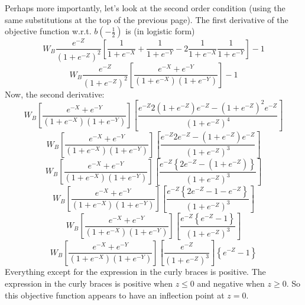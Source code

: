 \documentclass[12pt]{article}
\begin{document}
\vskip1in
Perhaps more importantly, let's look at the second order condition (using the same substitutions at the top of the previous page). The first derivative of the objective function w.r.t. $b(-\frac{1}{2})$ is (in logistic form)
\[
  W_B\frac{e^{-Z}}{\left(1+e^{-Z}\right)^2}\left[\frac{1}{1+e^{-X}} + \frac{1}{1+e^{-Y}} - 2\frac{1}{1+e^{-X}}  \frac{1}{1+e^{-Y}} \right] - 1
\]
\[
  W_B\frac{e^{-Z}}{\left(1+e^{-Z}\right)^2}\left[\frac{e^{-X} + e^{-Y}}{\left(1+e^{-X}\right)\left(1+e^{-Y}\right)} \right] - 1
\]
Now, the second derivative:
\[
  W_B\left[\frac{e^{-X} + e^{-Y}}{\left(1+e^{-X}\right)\left(1+e^{-Y}\right)} \right] \left[ \frac{e^{-Z} 2\left(1+e^{-Z}\right) e^{-Z}-\left(1+e^{-Z}\right)^2 e^{-Z}}{\left(1+e^{-Z}\right)^4} \right]
\]
\[
  W_B\left[\frac{e^{-X} + e^{-Y}}{\left(1+e^{-X}\right)\left(1+e^{-Y}\right)} \right] \left[ \frac{e^{-Z} 2 e^{-Z}-\left(1+e^{-Z}\right) e^{-Z}}{\left(1+e^{-Z}\right)^3} \right]
\]
\[
  W_B\left[\frac{e^{-X} + e^{-Y}}{\left(1+e^{-X}\right)\left(1+e^{-Y}\right)} \right] \left[ \frac{e^{-Z} \left\{2 e^{-Z}-\left(1+e^{-Z}\right) \right\}}{\left(1+e^{-Z}\right)^3} \right]
\]
\[
  W_B\left[\frac{e^{-X} + e^{-Y}}{\left(1+e^{-X}\right)\left(1+e^{-Y}\right)} \right] \left[ \frac{e^{-Z} \left\{2 e^{-Z}-1-e^{-Z} \right\}}{\left(1+e^{-Z}\right)^3} \right]
\]
\[
  W_B\left[\frac{e^{-X} + e^{-Y}}{\left(1+e^{-X}\right)\left(1+e^{-Y}\right)} \right] \left[ \frac{e^{-Z} \left\{e^{-Z}-1 \right\}}{\left(1+e^{-Z}\right)^3} \right]
\]
\[
  W_B\left[\frac{e^{-X} + e^{-Y}}{\left(1+e^{-X}\right)\left(1+e^{-Y}\right)} \right] \left[ \frac{e^{-Z}}{\left(1+e^{-Z}\right)^3} \right] \left\{e^{-Z}-1 \right\}
\]
Everything except for the expression in the curly braces is positive. The expression in the curly braces is positive when $z\leq0$ and negative when $z\geq0$. So this objective function appears to have an inflection point at $z=0$.
			
\end{document}
